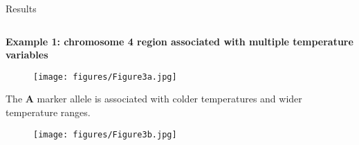 \documentclass[final]{beamer}
\newlength{\onecolwid}
\newlength{\twocolwid}
\begin{document}
\begin{frame}[t]
\begin{columns}[t]
\begin{column}{\twocolwid}
%


\begin{block}{Results}

\begin{columns}[t,totalwidth=\twocolwid] %


\begin{column}{\onecolwid} %



\vspace{0.5cm}


\begin{center}
\textbf{Example 1: chromosome 4 region associated with multiple temperature variables}
\end{center}

\begin{center}
\begin{figure}
  \texttt{[image: figures/Figure3a.jpg]}
\end{figure}
\end{center}

\vspace{2cm}


The \textbf{A} marker allele is associated with colder temperatures and wider temperature ranges.


\begin{center}
\begin{figure}
  \texttt{[image: figures/Figure3b.jpg]}
\end{figure}
\end{center}


\vspace{2cm}



\end{column}
\end{columns}
\end{block}
\end{column}
\end{columns}
\end{frame}
\end{document}
